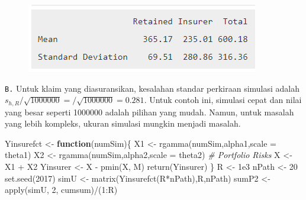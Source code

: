 \documentclass[
]{book}
\newenvironment{Shaded}{\begin{snugshade}}{\end{snugshade}}
\newcommand{\AttributeTok}[1]{\textcolor[rgb]{0.77,0.63,0.00}{#1}}
\newcommand{\CommentTok}[1]{\textcolor[rgb]{0.56,0.35,0.01}{\textit{#1}}}
\newcommand{\ControlFlowTok}[1]{\textcolor[rgb]{0.13,0.29,0.53}{\textbf{#1}}}
\newcommand{\DecValTok}[1]{\textcolor[rgb]{0.00,0.00,0.81}{#1}}
\newcommand{\FloatTok}[1]{\textcolor[rgb]{0.00,0.00,0.81}{#1}}
\newcommand{\FunctionTok}[1]{\textcolor[rgb]{0.00,0.00,0.00}{#1}}
\newcommand{\NormalTok}[1]{#1}
\newcommand{\OtherTok}[1]{\textcolor[rgb]{0.56,0.35,0.01}{#1}}
\newcommand{\SpecialCharTok}[1]{\textcolor[rgb]{0.00,0.00,0.00}{#1}}
\begin{document}
\begin{figure}

{\centering \includegraphics[width=1\linewidth]{images/6.1.3-1} 

}

\end{figure}

\texttt{B.} Untuk klaim yang diasuransikan, kesalahan standar perkiraan simulasi adalah \(s_{h,R}/\sqrt{1000000} =/\sqrt{1000000} =0.281\). Untuk contoh ini, simulasi cepat dan nilai yang besar seperti 1000000 adalah pilihan yang mudah. Namun, untuk masalah yang lebih kompleks, ukuran simulasi mungkin menjadi masalah.

\begin{Shaded}
\begin{Highlighting}[]
\NormalTok{Yinsurefct }\OtherTok{\textless{}{-}} \ControlFlowTok{function}\NormalTok{(numSim)\{}
\NormalTok{X1 }\OtherTok{\textless{}{-}} \FunctionTok{rgamma}\NormalTok{(numSim,alpha1,}\AttributeTok{scale =}\NormalTok{ theta1)  }
\NormalTok{X2 }\OtherTok{\textless{}{-}} \FunctionTok{rgamma}\NormalTok{(numSim,alpha2,}\AttributeTok{scale =}\NormalTok{ theta2)  }
\CommentTok{\# Portfolio Risks}
\NormalTok{X         }\OtherTok{\textless{}{-}}\NormalTok{ X1 }\SpecialCharTok{+}\NormalTok{ X2 }
\NormalTok{Yinsurer }\OtherTok{\textless{}{-}}\NormalTok{ X }\SpecialCharTok{{-}} \FunctionTok{pmin}\NormalTok{(X, M)}
\FunctionTok{return}\NormalTok{(Yinsurer)}
\NormalTok{\}}
\NormalTok{R }\OtherTok{\textless{}{-}} \FloatTok{1e3}
\NormalTok{nPath }\OtherTok{\textless{}{-}} \DecValTok{20}
\FunctionTok{set.seed}\NormalTok{(}\DecValTok{2017}\NormalTok{)}
\NormalTok{simU }\OtherTok{\textless{}{-}} \FunctionTok{matrix}\NormalTok{(}\FunctionTok{Yinsurefct}\NormalTok{(R}\SpecialCharTok{*}\NormalTok{nPath),R,nPath)}
\NormalTok{sumP2 }\OtherTok{\textless{}{-}} \FunctionTok{apply}\NormalTok{(simU, }\DecValTok{2}\NormalTok{, cumsum)}\SpecialCharTok{/}\NormalTok{(}\DecValTok{1}\SpecialCharTok{:}\NormalTok{R)}
\end{Highlighting}
\end{Shaded}
\end{document}
